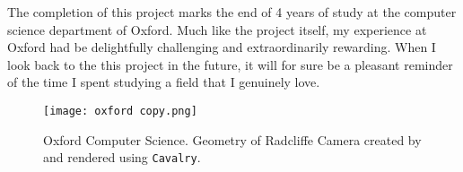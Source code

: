 The completion of this project marks the end of 4 years of study at the computer science department of Oxford. Much like the project itself, my experience at Oxford had be delightfully challenging and extraordinarily rewarding. When I look back to the this project in the future, it will for sure be a pleasant reminder of the time I spent studying a field that I genuinely love.

\begin{figure}[H]
    \centering
    \texttt{[image: oxford copy.png]}
    \caption{Oxford Computer Science. Geometry of Radcliffe Camera created by \cite{radcliffe} and rendered using \texttt{Cavalry}.}
\end{figure}